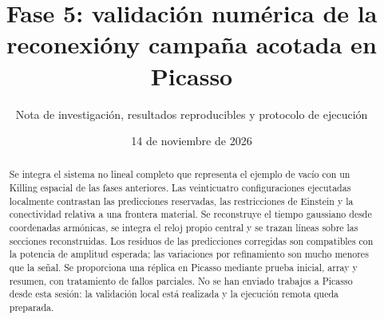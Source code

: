 \documentclass[11pt,a4paper]{article}
\title{Fase 5: validación numérica de la reconexión\newline y campaña acotada en Picasso}
\author{Nota de investigación, resultados reproducibles y protocolo de ejecución}
\date{14 de noviembre de 2026}
\begin{document}
\maketitle
\begin{abstract}
Se integra el sistema no lineal completo que representa el ejemplo de vacío con un Killing espacial de las fases anteriores. Las veinticuatro configuraciones ejecutadas localmente contrastan las predicciones reservadas, las restricciones de Einstein y la conectividad relativa a una frontera material. Se reconstruye el tiempo gaussiano desde coordenadas armónicas, se integra el reloj propio central y se trazan líneas sobre las secciones reconstruidas. Los residuos de las predicciones corregidas son compatibles con la potencia de amplitud esperada; las variaciones por refinamiento son mucho menores que la señal. Se proporciona una réplica en Picasso mediante prueba inicial, array y resumen, con tratamiento de fallos parciales. No se han enviado trabajos a Picasso desde esta sesión: la validación local está realizada y la ejecución remota queda preparada.
\end{abstract}
\end{document}
